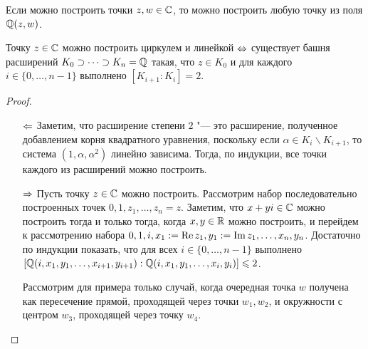 \begin{corollary}
	Если можно построить точки $z, w \in \mathbb{C}$, то можно построить любую точку из поля $\mathbb{Q}(z, w)$.
\end{corollary}

\begin{theorem}
	Точку $z \in \mathbb{C}$ можно построить циркулем и линейкой $\Leftrightarrow$ существует башня расширений $K_0 \supset \dotsb \supset K_n = \mathbb{Q}$ такая, что $z \in K_0$ и для каждого $i \in \{0, \dotsc, n - 1\}$ выполнено $[K_{i + 1} : K_{i}] = 2$.
\end{theorem}

\begin{proof}~
	\begin{itemize}
		\item[$\Leftarrow$] Заметим, что расширение степени $2$ "--- это расширение, полученное добавлением корня квадратного уравнения, поскольку если $\alpha \in K_i \backslash K_{i + 1}$, то система $(1, \alpha, \alpha^2)$ линейно зависима. Тогда, по индукции, все точки каждого из расширений можно построить.
		\item[$\Rightarrow$] Пусть точку $z \in \mathbb{C}$ можно построить. Рассмотрим набор последовательно построенных точек $0, 1, z_1, \dotsc, z_n = z$. Заметим, что $x + yi \in \mathbb{C}$ можно построить тогда и только тогда, когда $x, y \in \mathbb{R}$ можно построить, и перейдем к рассмотрению набора $0, 1, i, x_1 := \operatorname{Re}{z_1}, y_1 := \operatorname{Im}{z_1}, \dotsc, x_n, y_n$. Достаточно по индукции показать, что для всех $i \in \{0, \dotsc, n - 1\}$ выполнено $[\mathbb{Q}(i, x_1, y_1, \dotsc, x_{i + 1}, y_{i + 1}) : \mathbb{Q}(i, x_1, y_1, \dotsc, x_{i}, y_{i})] \leqslant 2$.
		
		Рассмотрим для примера только случай, когда очередная точка $w$ получена как пересечение прямой, проходящей через точки $w_1, w_2$, и окружности с центром $w_3$, проходящей через точку $w_4$.
		\begin{center}
\end{center}
\end{itemize}
\end{proof}
